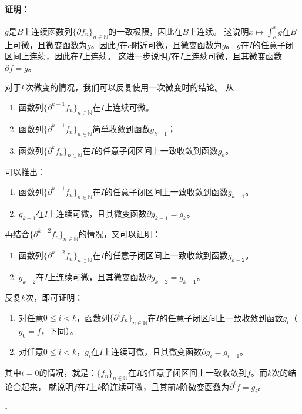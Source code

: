 \documentclass[12pt,UTF8]{ctexbook}
\theoremstyle{definition}
\theoremstyle{plain}
\renewenvironment{proof}{\paragraph{\textbf{证明：}}}{\hfill$\square$}
\begin{document}
\begin{appendix}
\begin{proof}
    $g$是$B$上连续函数列$\{\partial f_n\}_{n\in\mathbb{N}}$的一致极限，因此在$B$上连续。
    这说明$x\mapsto \int_c^x g $在$B$上可微，且微变函数为$g$。因此$f$在$c$附近可微，且微变函数为$g$。
    $g$在$I$的任意子闭区间上连续，因此在$I$上连续。
    这进一步说明$f$在$I$上连续可微，且其微变函数$\partial f = g$。
    
    对于$k$次微变的情况，我们可以反复使用一次微变时的结论。
    从
    \begin{enumerate}
        \item 函数列$\{\partial^{k-1} f_n\}_{n\in\mathbb{N}}$在$I$上连续可微。
        \item 函数列$\{\partial^{k-1} f_n\}_{n\in\mathbb{N}}$简单收敛到函数$g_{k-1}$；
        \item 函数列$\{\partial^k f_n\}_{n\in\mathbb{N}}$在$I$的任意子闭区间上一致收敛到函数$g_k$。
    \end{enumerate}
    可以推出：
    \begin{enumerate}
        \item 函数列$\{\partial^{k-1} f_n\}_{n\in\mathbb{N}}$在$I$的任意子闭区间上一致收敛到函数$g_{k-1}$。
        \item $g_{k-1}$在$I$上连续可微，且其微变函数$\partial g_{k-1} = g_k$。
    \end{enumerate}
    再结合$\{\partial^{k-2} f_n\}_{n\in\mathbb{N}}$的情况，又可以证明：
    \begin{enumerate}
        \item 函数列$\{\partial^{k-2} f_n\}_{n\in\mathbb{N}}$在$I$的任意子闭区间上一致收敛到函数$g_{k-2}$。
        \item $g_{k-2}$在$I$上连续可微，且其微变函数$\partial g_{k-2} = g_{k-1}$。
    \end{enumerate}
    反复$k$次，即可证明：
    \begin{enumerate}
        \item 对任意$0\leqslant i < k$，函数列$\{\partial^{i} f_n\}_{n\in\mathbb{N}}$在$I$的任意子闭区间上一致收敛到函数$g_{i}$（$g_0 = f$，下同）。
        \item 对任意$0\leqslant i < k$，$g_{i}$在$I$上连续可微，且其微变函数$\partial g_{i} = g_{i+1}$。
    \end{enumerate}
    其中$i = 0$的情况，就是：$\{f_n\}_{n\in\mathbb{N}}$在$I$的任意子闭区间上一致收敛到$f$。而$k$次的结论合起来，
    就说明$f$在$I$上$k$阶连续可微，且其前$k$阶微变函数为$\partial^i f = g_i$。

\end{proof}


\end{appendix}
\end{document}
